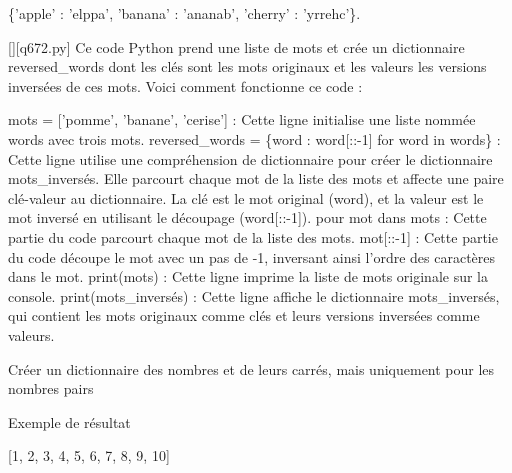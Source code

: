 \{'apple' : 'elppa', 'banana' : 'ananab', 'cherry' : 'yrrehc'\}.
        \par
        \begin{solution}
            \renewcommand{\nomfichier}{q672.py}
            \pythonfile{\chemincode \nomfichier}[][\nomfichier]
            Ce code Python prend une liste de mots et crée un dictionnaire reversed\_words dont les clés sont les mots originaux et les valeurs les versions inversées de ces mots. Voici comment fonctionne ce code :

    mots = ['pomme', 'banane', 'cerise'] : Cette ligne initialise une liste nommée words avec trois mots.
    reversed\_words = \{word : word[::-1] for word in words\} : Cette ligne utilise une compréhension de dictionnaire pour créer le dictionnaire mots\_inversés. Elle parcourt chaque mot de la liste des mots et affecte une paire clé-valeur au dictionnaire. La clé est le mot original (word), et la valeur est le mot inversé en utilisant le découpage (word[::-1]).
        pour mot dans mots : Cette partie du code parcourt chaque mot de la liste des mots.
        mot[::-1] : Cette partie du code découpe le mot avec un pas de -1, inversant ainsi l'ordre des caractères dans le mot.
    print(mots) : Cette ligne imprime la liste de mots originale sur la console.
    print(mots\_inversés) : Cette ligne affiche le dictionnaire mots\_inversés, qui contient les mots originaux comme clés et leurs versions inversées comme valeurs.
        \end{solution}
        

        \question
        Créer un dictionnaire des nombres et de leurs carrés, mais uniquement pour les nombres pairs

Exemple de résultat

[1, 2, 3, 4, 5, 6, 7, 8, 9, 10]

